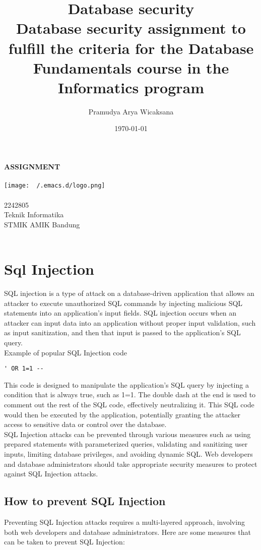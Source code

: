 \documentclass[11pt]{article}
\author{Pramudya Arya Wicaksana}
\date{\today}
\title{Database security\\\medskip
\large Database security assignment to fulfill the criteria for the Database Fundamentals course in the Informatics program}
\makeatletter
\renewcommand{\maketitle}{
\begin{titlepage}
\begin{center}
\Huge \textbf{ASSIGNMENT} \\
\vspace{1em}
\Huge \textbf{\@title} \\
\bigbreak
\vspace{2em}
\texttt{[image: ~/.emacs.d/logo.png]} \\
\bigbreak
\vspace{1em}
\Large \textbf{\@author} \\
\large 2242805  \\
\bigbreak
\vspace{4em}
\large Teknik Informatika \\
\large STMIK AMIK Bandung \\
\Large \@date \\
\end{center}
\end{titlepage}
}
\let\oldsection\section
\renewcommand\section{\clearpage\oldsection}
\makeatother
\begin{document}
\maketitle
\tableofcontents

\setlength\parindent{0pt}


\section{Sql Injection}
\label{sec:orga50eb9c}

SQL injection is a type of attack on a database-driven application that allows an attacker to execute unauthorized SQL commands by injecting malicious SQL statements into an application's input fields. SQL injection occurs when an attacker can input data into an application without proper input validation, such as input sanitization, and then that input is passed to the application's SQL query.\\

Example of popular SQL Injection code\\

\begin{verbatim}
' OR 1=1 --
\end{verbatim}

This code is designed to manipulate the application's SQL query by injecting a condition that is always true, such as 1=1. The double dash at the end is used to comment out the rest of the SQL code, effectively neutralizing it. This SQL code would then be executed by the application, potentially granting the attacker access to sensitive data or control over the database.\\

SQL Injection attacks can be prevented through various measures such as using prepared statements with parameterized queries, validating and sanitizing user inputs, limiting database privileges, and avoiding dynamic SQL. Web developers and database administrators should take appropriate security measures to protect against SQL Injection attacks.\\

\subsection{How to prevent SQL Injection}
\label{sec:orgd692a93}

Preventing SQL Injection attacks requires a multi-layered approach, involving both web developers and database administrators. Here are some measures that can be taken to prevent SQL Injection:\\
\end{document}
